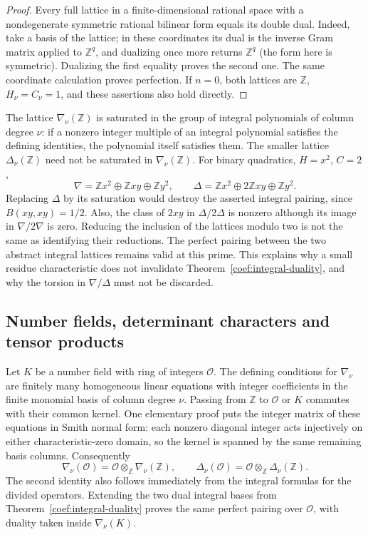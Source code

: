 \begin{proof}
Every full lattice in a finite-dimensional rational space with a
nondegenerate symmetric rational bilinear form equals its double dual.
Indeed, take a basis of the lattice; in these coordinates its dual is
the inverse Gram matrix applied to $\mathbb Z^q$, and dualizing once
more returns $\mathbb Z^q$ (the form here is symmetric).
Dualizing the first equality proves the second one. The same coordinate
calculation proves perfection. If $n=0$, both lattices are
$\mathbb Z$, $H_\nu=C_\nu=1$, and these assertions also hold directly.
\end{proof}

\begin{remark}\label{coef:saturation}
The lattice $\nabla_\nu(\mathbb Z)$ is saturated in the group of
integral polynomials of column degree $\nu$: if a nonzero integer
multiple of an integral polynomial satisfies the defining identities,
the polynomial itself satisfies them. The smaller lattice
$\Delta_\nu(\mathbb Z)$ need not be saturated in
$\nabla_\nu(\mathbb Z)$.
For binary quadratics, $H=x^2$, $C=2$,
\[
 \nabla=\mathbb Zx^2\oplus\mathbb Zxy\oplus\mathbb Zy^2,
 \qquad
 \Delta=\mathbb Zx^2\oplus2\mathbb Zxy\oplus\mathbb Zy^2.
\]
Replacing $\Delta$ by its saturation would destroy the asserted
integral pairing, since $B(xy,xy)=1/2$.
Also, the class of $2xy$ in $\Delta/2\Delta$ is nonzero although its
image in $\nabla/2\nabla$ is zero. Reducing the inclusion of the
lattices modulo two is not the same as identifying their reductions.
The perfect pairing between the two abstract integral lattices remains
valid at this prime. This explains why a small residue characteristic
does not invalidate Theorem~\ref{coef:integral-duality}, and why the
torsion in $\nabla/\Delta$ must not be discarded.
\end{remark}

\subsection{Number fields, determinant characters and tensor products}

Let $K$ be a number field with ring of integers $\mathcal O$.
The defining conditions for $\nabla_\nu$ are finitely many homogeneous
linear equations with integer coefficients in the finite monomial
basis of column degree $\nu$. Passing from $\mathbb Z$ to $\mathcal O$
or $K$ commutes with their common kernel. One elementary proof puts
the integer matrix of these equations in Smith normal form: each
nonzero diagonal integer acts injectively on either characteristic-zero
domain, so the kernel is spanned by the same remaining basis columns.
Consequently
\[
 \nabla_\nu(\mathcal O)=\mathcal O\otimes_{\mathbb Z}
                 \nabla_\nu(\mathbb Z),\qquad
 \Delta_\nu(\mathcal O)=\mathcal O\otimes_{\mathbb Z}
                 \Delta_\nu(\mathbb Z).
\]
The second identity also follows immediately from the integral formulas
for the divided operators. Extending the two dual integral bases from
Theorem~\ref{coef:integral-duality} proves the same perfect pairing over
$\mathcal O$, with duality taken inside $\nabla_\nu(K)$.

